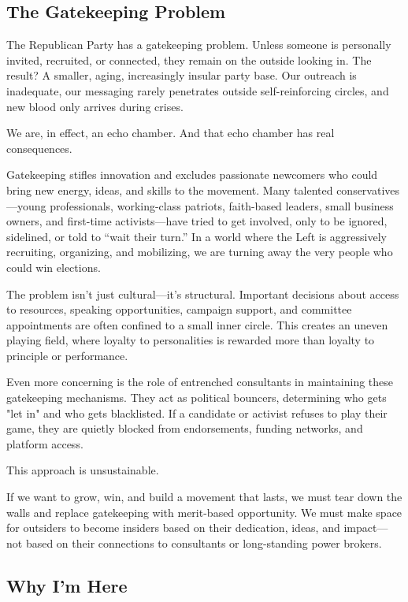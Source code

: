 \subsection{The Gatekeeping Problem}

The Republican Party has a gatekeeping problem. Unless someone is personally invited, recruited, or connected, they remain on the outside looking in. The result? A smaller, aging, increasingly insular party base. Our outreach is inadequate, our messaging rarely penetrates outside self-reinforcing circles, and new blood only arrives during crises.

We are, in effect, an echo chamber. And that echo chamber has real consequences.

Gatekeeping stifles innovation and excludes passionate newcomers who could bring new energy, ideas, and skills to the movement. Many talented conservatives---young professionals, working-class patriots, faith-based leaders, small business owners, and first-time activists---have tried to get involved, only to be ignored, sidelined, or told to “wait their turn.” In a world where the Left is aggressively recruiting, organizing, and mobilizing, we are turning away the very people who could win elections.

The problem isn't just cultural---it's structural. Important decisions about access to resources, speaking opportunities, campaign support, and committee appointments are often confined to a small inner circle. This creates an uneven playing field, where loyalty to personalities is rewarded more than loyalty to principle or performance.

Even more concerning is the role of entrenched consultants in maintaining these gatekeeping mechanisms. They act as political bouncers, determining who gets "let in" and who gets blacklisted. If a candidate or activist refuses to play their game, they are quietly blocked from endorsements, funding networks, and platform access.

This approach is unsustainable.

If we want to grow, win, and build a movement that lasts, we must tear down the walls and replace gatekeeping with merit-based opportunity. We must make space for outsiders to become insiders based on their dedication, ideas, and impact---not based on their connections to consultants or long-standing power brokers.

\subsection{Why I'm Here}

